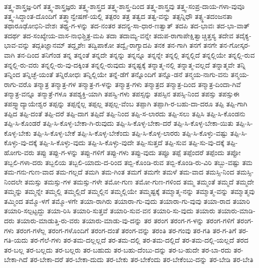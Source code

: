 {ತತ್ತ್ವ-ಶಾಸ್ತ್ರಜ್ಞ-ರಿಗೆ
ತತ್ತ್ವ-ಶಾಸ್ತ್ರಜ್ಞರು
ತತ್ತ್ವ-ಶಾಸ್ತ್ರದ
ತತ್ತ್ವ-ಶಾಸ್ತ್ರ-ದಿಂದ
ತತ್ತ್ವ-ಶಾಸ್ತ್ರವು
ತತ್ತ್ವ-ಸಂಪ್ರ-ದಾಯ-ಗಳಾ-ವುವೂ
ತತ್ತ್ವ-ಸಿದ್ಧಾಂತ-ದೊಂದಿಗೆ
ತತ್ತ್ವಾನ್ವೇಷಣೆ-ಯಲ್ಲಿ
ತತ್ಪರಂ
ತತ್ರ
ತತ್ವದ
ತತ್ವ-ವನ್ನು
ತತ್ಸನ್ನಿಧೌ
ತತ್ಸ್ಥ-ತದಂಜನತಾ
ತಥಾರೂಢೋಭಿನಿ-ವೇಶಃ
ತಥ್ಯ-ಗ-ಳನ್ನು
ತದ-ನಂತರ
ತದನ್ಯ-ಸಾ-ಧಾರ-ಣತ್ವಾತ್
ತದಪಿ
ತದ-ಭಾವಃ
ತದ-ಭಾ-ವಾತ್
ತದರ್ಥ
ತದ-ಸಂಖ್ಯೇಯ-ವಾಸ-ನಾಭಿಶ್ಚಿತ್ರ-ಮಪಿ
ತದಾ
ತದಾಮ್ಯ-ವನ್ನೇ
ತದುಪ-ರಾಗಾಪೇಕ್ಷಿತ್ವಾಚ್ಚಿತ್ತಸ್ಯ
ತದೇವ
ತದೈಕ್ಯ-ಭಾವ-ವನ್ನು
ತದ್ಗತಿಜ್ಞಾನಮ್
ತದ್ದೃಶೇಃ
ತದ್ವಿಪಾಕೋ
ತದ್ವೈ-ರಾಗ್ಯಾದಪಿ
ತನಕ
ತನ-ಗಾಗಿ
ತನಗೆ
ತನಗೇ
ತನ-ಗೋಸ್ಕರ-ವಾಗಿ
ತನ-ದಿಂದ
ತನಿಗೆಂಡ
ತನ್ನ
ತನ್ನಂತೆ
ತನ್ನದೇ
ತನ್ನನ್ನು
ತನ್ನನ್ನೂ
ತನ್ನನ್ನೇ
ತನ್ನಲ್ಲಿ
ತನ್ನಲ್ಲಿದೆ
ತನ್ನಲ್ಲಿಯೇ
ತನ್ನಲ್ಲಿ-ರುವ
ತನ್ನಲ್ಲಿ-ರು-ವರು
ತನ್ನಲ್ಲಿ-ರು-ವು-ದಕ್ಕಿಂತ
ತನ್ನಲ್ಲಿ-ರುವುದು
ತನ್ನಷ್ಟಕ್ಕೆ
ತನ್ನಾತ್ಮ-ನಲ್ಲಿ
ತನ್ನಾತ್ಮ-ವಲ್ಲದೆ
ತನ್ನಾತ್ಮವೇ
ತನ್ನಿ
ತನ್ನಿಂದ
ತನ್ನಿಚ್ಛೆ-ಯಂತೆ
ತನ್ನಿರೋಧಃ
ತನ್ನಿಲ್ಲಿಯೇ
ತನ್ನೆ-ಡೆಗೆ
ತನ್ನೊಂದಿಗೆ
ತನ್ನೊ-ಡನೆ
ತನ್ಮಯ-ನಾಗು-ವನು
ತನ್ಮಯ-ರಾಗು-ವರೊ
ತನ್ಮಾತ್ರ
ತನ್ಮಾತ್ರ-ಗಳ
ತನ್ಮಾತ್ರ-ಗ-ಳನ್ನು
ತನ್ಮಾತ್ರ-ಗಳು
ತನ್ಮಾತ್ರದ
ತನ್ಮಾತ್ರ-ದಿಂದ
ತನ್ಮಾತ್ರ-ದಿಂದಾ-ಗಿವೆ
ತನ್ಮಾತ್ರ-ವನ್ನೂ
ತನ್ಮಾತ್ರೆ-ಗಳೂ
ತಪಶ್ಯಕ್ತಿ-ಯಾಗಿ
ತಪಸ್ವಿ-ಗಳು
ತಪಸ್ಸನ್ನು
ತಪಸ್ಸಿನ
ತಪಸ್ಸಿ-ನಿಂದ
ತಪಸ್ಸು
ತಪಸ್ಸುಈ
ತಪಸ್ಸ್ವಾದ್ಯಾಯೇಶ್ವರ
ತಪ್ಪನ್ನು
ತಪ್ಪನ್ನೆಲ್ಲ
ತಪ್ಪಲ್ಲ
ತಪ್ಪಲ್ಲ-ವೆಂಬ
ತಪ್ಪಾಗಿ
ತಪ್ಪಾಗಿ-ರ-ಬಹು-ದಾ-ದರೂ
ತಪ್ಪಿ
ತಪ್ಪಿ-ಗಾಗಿ
ತಪ್ಪಿದ
ತಪ್ಪಿ-ದಂತೆ
ತಪ್ಪಿ-ದರೆ
ತಪ್ಪಿ-ದಾಗ
ತಪ್ಪಿದೆ
ತಪ್ಪಿ-ನಿಂದ
ತಪ್ಪಿ-ಸ-ಲಾರದು
ತಪ್ಪಿ-ಸಲು
ತಪ್ಪಿಸಿ
ತಪ್ಪಿ-ಸಿ-ಕೊಂಡನು
ತಪ್ಪಿ-ಸಿ-ಕೊಂಡರೆ
ತಪ್ಪಿ-ಸಿ-ಕೊಳ್ಳ-ಬೇಕಾ-ಗಿ-ರುವುದು
ತಪ್ಪಿ-ಸಿ-ಕೊಳ್ಳ-ಬೇಕಾ-ದರೆ
ತಪ್ಪಿ-ಸಿ-ಕೊಳ್ಳ-ಬೇಕಾ-ಯಿತು
ತಪ್ಪಿ-ಸಿ-ಕೊಳ್ಳ-ಬೇಕು
ತಪ್ಪಿ-ಸಿ-ಕೊಳ್ಳ-ಬೇಕೆ
ತಪ್ಪಿ-ಸಿ-ಕೊಳ್ಳ-ಬೇಕೆಂದು
ತಪ್ಪಿ-ಸಿ-ಕೊಳ್ಳ-ಲಾರರು
ತಪ್ಪಿ-ಸಿ-ಕೊಳ್ಳು-ವಷ್ಟು
ತಪ್ಪಿ-ಸಿ-ಕೊಳ್ಳು-ವು-ದಕ್ಕೆ
ತಪ್ಪಿ-ಸಿ-ಕೊಳ್ಳು-ವುದು
ತಪ್ಪಿ-ಸಿ-ಕೊಳ್ಳು-ವುದೇ
ತಪ್ಪಿ-ಸುತ್ತದೆ
ತಪ್ಪಿ-ಸುವ
ತಪ್ಪಿ-ಸು-ವು-ದಕ್ಕೆ
ತಪ್ಪಿ-ಹೋಗು-ವರು
ತಪ್ಪು
ತಪ್ಪು-ಗ-ಳನ್ನು
ತಪ್ಪು-ಗಳಿಗೆ
ತಪ್ಪು-ಗಳು
ತಪ್ಪು-ವುದು
ತಪ್ಪೂ
ತಪ್ಪೆ
ತಪ್ಪೆಂದರೆ
ತಪ್ಪೆಂದು
ತಪ್ಪೋ
ತಬ್ಬಲಿ-ಗಳಾ-ದರು
ತಬ್ಬಲಿಯ
ತಬ್ಬಲಿ-ಯಾದು-ದ-ರಿಂದ
ತಬ್ಬಿ-ಕೊಂಡಿ-ರುವ
ತಬ್ಬಿ-ಕೊಂಡಿ-ರು-ವಿರಿ
ತಬ್ಬು-ವಷ್ಟು
ತಮ
ತಮ-ಗನು-ಗುಣ-ವಾದ
ತಮ-ಗಲ್ಲದೆ
ತಮಗಿ
ತಮ-ಗಿಂತ
ತಮಗೆ
ತಮಗೇ
ತಮಳೆ
ತಮ-ವಾದ
ತಮಸ್ಸಿ-ನಿಂದ
ತಮಸ್ಸಿ-ನಿಂದಲೇ
ತಮಸ್ಸು
ತಮಸ್ಸು-ಗಳ
ತಮಸ್ಸು-ಗಳೇ
ತಮೋ-ಗುಣ
ತಮೋ-ಗುಣ-ಗಳಿಂದ
ತಮ್ಮ
ತಮ್ಮಂತೆ
ತಮ್ಮದೆ
ತಮ್ಮದೇ
ತಮ್ಮನ್ನು
ತಮ್ಮನ್ನೇ
ತಮ್ಮಲ್ಲಿ
ತಮ್ಮಲ್ಲಿದೆ
ತಮ್ಮಲ್ಲಿನ
ತಮ್ಮಲ್ಲಿಯೇ
ತಮ್ಮಷ್ಟಕ್ಕೆ
ತಮ್ಮಾತ್ಮ-ನನ್ನು
ತಮ್ಮಾತ್ಮ-ವನ್ನು
ತಮ್ಮಾತ್ಮವು
ತಮ್ಮಿಂದ
ತಮ್ಮೊ-ಳಗೆ
ತಮ್ಮೊ-ಳಗೇ
ತಯಾ-ರಾಗಿರು
ತಯಾರಾ-ಗು-ವುದು
ತಯಾರಾ-ಗು-ವುವು
ತಯಾ-ರಾದ
ತಯಾರಿ
ತಯಾರಿ-ಸಲ್ಪಟ್ಟದ್ದು
ತಯಾ-ರಿಸಿ
ತಯಾರಿ-ಸುತ್ತವೆ
ತಯಾರಿ-ಸುವ-ವನ
ತಯಾರಿ-ಸು-ವುದು
ತಯಾರು
ತಯಾರು-ಮಾಡಿ-ದರು
ತಯಾರು-ಮಾಡುತ್ತಿ-ರು-ವರು
ತಯಾರು-ಮಾಡು-ವು-ದನ್ನು
ತರ
ತರಂಗ
ತರಂಗ-ಗ-ಳನ್ನು
ತರಂಗ-ಗಳಿಗೆ
ತರಂಗ-ಗಳು
ತರಂಗ-ಗಳೆಲ್ಲ
ತರಂಗ-ಗಳೊಂದಿಗೆ
ತರಂಗ-ದಂತೆ
ತರಂಗ-ವನ್ನು
ತರಂತಿ
ತರ-ಗಂವು
ತರ-ಗತಿ
ತರ-ಗ-ತಿಗೆ
ತರ-ಗತಿ-ಯದು
ತರ-ಗೆಲೆ-ಗಳು
ತರ-ತಮ-ದಲ್ಲಲ್ಲದೆ
ತರ-ತಮ-ದಲ್ಲಿ
ತರ-ತಮ-ದಲ್ಲಿದೆ
ತರ-ತಮ-ದಲ್ಲಿ-ಯಲ್ಲದೆ
ತರದ
ತರ-ಬಲ್ಲ
ತರ-ಬಲ್ಲದು
ತರ-ಬಲ್ಲರು
ತರ-ಬಹುದು
ತರ-ಬಹು-ದೆಂಬು-ದನ್ನು
ತರ-ಬ-ಹುದೇ
ತರ-ಬಾ-ರದು
ತರ-ಬೇಕಾ-ಗಿದೆ
ತರ-ಬೇಕಾ-ದರೆ
ತರ-ಬೇಕಾ-ದುದು
ತರ-ಬೇಕು
ತರ-ಬೇಕೆಂದು
ತರ-ಬೇಕೆಂಬು-ದನ್ನು
ತರ-ಬೇಡಿ
ತರ-ಬೇತಿ
}
